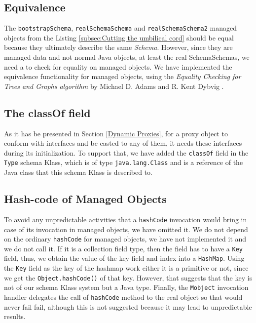 \subsection{Equivalence}\label{Managed Object equivalence}
The \texttt{bootstrapSchema}, \texttt{realSchemaSchema} and \texttt{realSchemaSchema2} managed objects from the Listing \ref{subsec:Cutting the umbilical cord} should be equal because they ultimately describe the same \textit{Schema}.
However, since they are managed data and not normal Java objects, at least the real SchemaSchemas, we need a to check for equality on managed objects.
We have implemented the equivalence functionality for managed objects, using the \textit{Equality Checking for Trees and Graphs
algorithm} by Michael D. Adams and R. Kent Dybvig \cite{adams2008efficient}.

\subsection{The classOf field}\label{The classOf field}
As it has be presented in Section \ref{Dynamic Proxies}, for a proxy object to conform with interfaces and be casted to any of them, it needs these interfaces during its initialization.
To support that, we have added the \texttt{classOf} field in the \texttt{Type} schema Klass, which is of type \texttt{java.lang.Class} and is a reference of the Java class that this schema Klass is described to.

\subsection{Hash-code of Managed Objects}\label{Hashcode of Managed Objects}
To avoid any unpredictable activities that a \texttt{hashCode} invocation would bring in case of its invocation in managed objects, we have omitted it. 
We do not depend on the ordinary \texttt{hashCode} for managed objects, we have not implemented it and we do not call it. 
If it is a collection field type, then the field has to have a \texttt{Key} field, thus, we obtain the value of the key field and index into a \texttt{HashMap}. 
Using the \texttt{Key} field as the key of the hashmap work either it is a primitive or not, since we get the \texttt{Object.hashCode()} of that key.
However, that suggests that the key is not of our schema Klass system but a Java type.
Finally, the \texttt{Mobject} invocation handler delegates the call of \texttt{hashCode} method to the real object so that would never fail fail, although this is not suggested because it may lead to unpredictable results.

